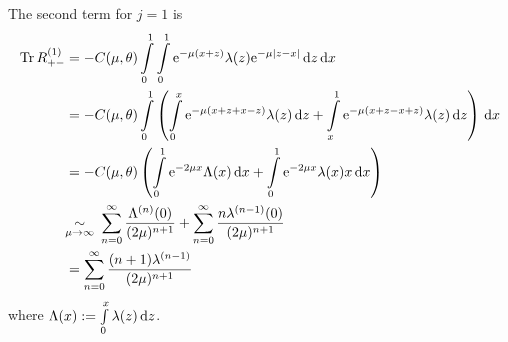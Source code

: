 The second term for $j=1$ is
\begin{align*}
    \Tr R^{(1)}_{+-} &= -C(\mu,\theta)
        \Integ[1]{0}{x}{
            \Integ[1]{0}{z}{\Eto{-\mu(x+z)}
                \lambda(z)\Eto{-\mu\left|z-x\right|}
            }
        } \\
        &= -C(\mu,\theta)
            \Integ[1]{0}{x}{\left(
                \Integ[x]{0}{z}{
                    \Eto{-\mu(x+z+x-z)} \lambda(z)
                }
                +
                \Integ[1]{x}{z}{
                    \Eto{-\mu(x+z-x+z)} \lambda(z)
                }
                \right)
            } \\
        &= -C(\mu,\theta) \left(
            \Integ[1]{0}{x}{\Eto{-2\mu x} \Lambda(x)}
            + \Integ[1]{0}{x}{\Eto{-2\mu x}\lambda(x)x}
            \right) \\
        &\SimAs{\mu\to\infty}\ 
            \sum_{n=0}^\infty \frac{\Lambda^{(n)}(0)}{(2\mu)^{n+1}}
            + \sum_{n=0}^\infty \frac{n\lambda^{(n-1)}(0)}{(2\mu)^{n+1}} \\
        &= \sum_{n=0}^\infty \frac{(n+1)\lambda^{(n-1)}}{(2\mu)^{n+1}}
\end{align*}
where $\Lambda(x) := \Integ[x]{0}{z}{\lambda(z)}$.
